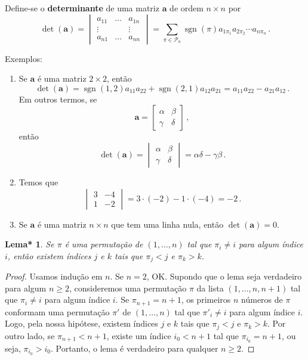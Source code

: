 \documentclass[12pt,a4paper]{report}
\newcommand{\mb}{\mathbf}
\newcommand{\mc}{\mathcal}
\newtheorem{lem*}[thm]{Lema*}
\DeclareMathOperator{\sgn}{sgn}
\begin{document}
Define-se o \textbf{determinante} de uma matriz $\mb a$ de ordem $n\times n$ por
$$\det(\mb a)=\begin{vmatrix}
  a_{11}&\ldots& a_{1n}\\
  \vdots&&\vdots\\
  a_{n1}&\ldots&a_{nn}
\end{vmatrix}=\sum_{\pi\in\mc P_n}\sgn(\pi)a_{1\pi_1}a_{2\pi_2}\cdots a_{n\pi_n}\,.$$

Exemplos:
\begin{enumerate}
  \item Se $\mb a$ é uma matriz $2\times 2$, então
 $$\det(\mb a)=\sgn(1,2)a_{11}a_{22}+\sgn(2,1)a_{12}a_{21}=a_{11}a_{22}-a_{21}a_{12}\,.$$
 Em outros termos, se
 $$\mb a=\begin{bmatrix}
   \alpha&\beta\\
   \gamma&\delta
 \end{bmatrix}\,,$$
 então
 $$\det(\mb a)=\begin{vmatrix}
   \alpha&\beta\\
   \gamma&\delta
 \end{vmatrix}=\alpha\delta-\gamma\beta\,.$$
 \item Temos que
 $$\begin{vmatrix}
   3&-4\\
   1&-2
 \end{vmatrix}=3\cdot (-2)-1\cdot (-4)=-2\,.$$
 \item Se $\mb a$ é uma matriz $n\times n$ que tem uma linha nula, então $\det(\mb a)=0$.
\end{enumerate}

\begin{lem*}
  \label{perm.nonid}
  Se $\pi$ é uma permutação de $(1,\ldots,n)$ tal que $\pi_i\ne i$ para algum índice $i$, então existem índices $j$ e $k$ tais que $\pi_j<j$ e $\pi_k>k$.
\end{lem*}
\begin{proof}
  Usamos indução em $n$. Se $n=2$, OK. Supondo que o lema seja verdadeiro para algum $n\ge 2$, consideremos uma permutação $\pi$ da lista $(1,\ldots,n,n+1)$ tal que $\pi_i\ne i$ para algum índice $i$. Se $\pi_{n+1}=n+1$, os primeiros $n$ números de $\pi$ conformam uma permutação $\pi'$ de $(1,\ldots,n)$ tal que $\pi'_i\ne i$ para algum índice $i$.
  Logo, pela nossa hipótese, existem índices $j$ e $k$ tais que $\pi_j<j$ e $\pi_k>k$.
  Por outro lado, se $\pi_{n+1}<n+1$, existe um índice $i_0<n+1$ tal que $\pi_{i_0}=n+1$, ou seja, $\pi_{i_0}>i_0$. Portanto, o lema é verdadeiro para qualquer $n\ge 2$.
\end{proof}
\end{document}
